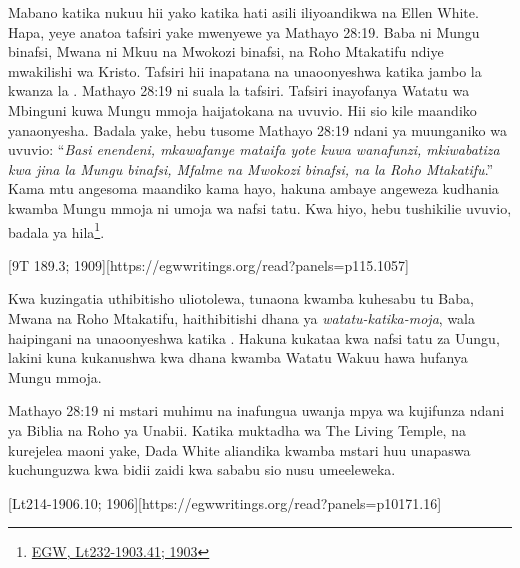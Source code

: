 Mabano katika nukuu hii yako katika hati asili iliyoandikwa na Ellen White. Hapa, yeye anatoa tafsiri yake mwenyewe ya Mathayo 28:19. Baba ni Mungu binafsi, Mwana ni Mkuu na Mwokozi binafsi, na Roho Mtakatifu ndiye mwakilishi wa Kristo. Tafsiri hii inapatana na  unaoonyeshwa katika jambo la kwanza la . Mathayo 28:19 ni suala la tafsiri. Tafsiri inayofanya Watatu wa Mbinguni kuwa Mungu mmoja haijatokana na uvuvio. Hii sio kile maandiko yanaonyesha. Badala yake, hebu tusome Mathayo 28:19 ndani ya muunganiko wa uvuvio: “\textit{Basi enendeni, mkawafanye mataifa yote kuwa wanafunzi, mkiwabatiza kwa jina la Mungu binafsi, Mfalme na Mwokozi binafsi, na la Roho Mtakatifu}.” Kama mtu angesoma maandiko kama hayo, hakuna ambaye angeweza kudhania kwamba Mungu mmoja ni umoja wa nafsi tatu. Kwa hiyo, hebu tushikilie uvuvio, badala ya hila\footnote{\href{https://egwwritings.org/?ref=en\_Lt232-1903.41&para=10197.50}{{EGW, Lt232-1903.41; 1903}}}.


[9T 189.3; 1909][https://egwwritings.org/read?panels=p115.1057]


Kwa kuzingatia uthibitisho uliotolewa, tunaona kwamba kuhesabu tu Baba, Mwana na Roho Mtakatifu, haithibitishi dhana ya \textit{watatu-katika-moja}, wala haipingani na  unaoonyeshwa katika . Hakuna kukataa kwa nafsi tatu za Uungu, lakini kuna kukanushwa kwa dhana kwamba Watatu Wakuu hawa hufanya Mungu mmoja.


Mathayo 28:19 ni mstari muhimu na inafungua uwanja mpya wa kujifunza ndani ya Biblia na Roho ya Unabii. Katika muktadha wa The Living Temple, na kurejelea maoni yake, Dada White aliandika kwamba mstari huu unapaswa kuchunguzwa kwa bidii zaidi kwa sababu sio nusu umeeleweka.


[Lt214-1906.10; 1906][https://egwwritings.org/read?panels=p10171.16]


